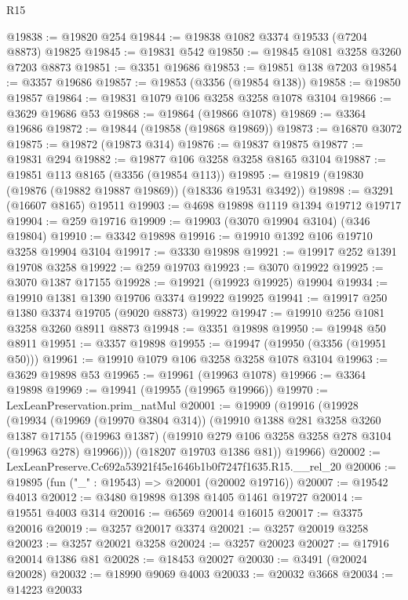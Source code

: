 \begin{lexlean}{R15}
\begin{coremodule}
@19838 := @19820 @254
@19844 := @19838 @1082 @3374 @19533 (@7204 @8873) @19825
@19845 := @19831 @542
@19850 := @19845 @1081 @3258 @3260 @7203 @8873
@19851 := @3351 @19686
@19853 := @19851 @138 @7203
@19854 := @3357 @19686
@19857 := @19853 (@3356 (@19854 @138))
@19858 := @19850 @19857
@19864 := @19831 @1079 @106 @3258 @3258 @1078 @3104
@19866 := @3629 @19686 @53
@19868 := @19864 (@19866 @1078)
@19869 := @3364 @19686
@19872 := @19844 (@19858 (@19868 @19869))
@19873 := @16870 @3072
@19875 := @19872 (@19873 @314)
@19876 := @19837 @19875
@19877 := @19831 @294
@19882 := @19877 @106 @3258 @3258 @8165 @3104
@19887 := @19851 @113 @8165 (@3356 (@19854 @113))
@19895 := @19819 (@19830 (@19876 (@19882 @19887 @19869)) (@18336 @19531 @3492))
@19898 := @3291 (@16607 @8165) @19511
@19903 := @4698 @19898 @1119 @1394 @19712 @19717
@19904 := @259 @19716
@19909 := @19903 (@3070 @19904 @3104) (@346 @19804)
@19910 := @3342 @19898
@19916 := @19910 @1392 @106 @19710 @3258 @19904 @3104
@19917 := @3330 @19898
@19921 := @19917 @252 @1391 @19708 @3258
@19922 := @259 @19703
@19923 := @3070 @19922
@19925 := @3070 @1387 @17155
@19928 := @19921 (@19923 @19925) @19904
@19934 := @19910 @1381 @1390 @19706 @3374 @19922 @19925
@19941 := @19917 @250 @1380 @3374 @19705 (@9020 @8873) @19922
@19947 := @19910 @256 @1081 @3258 @3260 @8911 @8873
@19948 := @3351 @19898
@19950 := @19948 @50 @8911
@19951 := @3357 @19898
@19955 := @19947 (@19950 (@3356 (@19951 @50)))
@19961 := @19910 @1079 @106 @3258 @3258 @1078 @3104
@19963 := @3629 @19898 @53
@19965 := @19961 (@19963 @1078)
@19966 := @3364 @19898
@19969 := @19941 (@19955 (@19965 @19966))
@19970 := LexLeanPreservation.prim_natMul
@20001 := @19909
    (@19916
      (@19928
        (@19934
          (@19969 (@19970 @3804 @314))
          (@19910
            @1388
            @281
            @3258
            @3260
            @1387
            @17155
            (@19963 @1387)
            (@19910 @279 @106 @3258 @3258 @278 @3104 (@19963 @278) @19966)))
        (@18207 @19703 @1386 @81))
      @19966)
@20002 := LexLeanPreserve.Cc692a53921f45e1646b1b0f7247f1635.R15.__rel_20
@20006 := @19895 (fun ("_" : @19543) => @20001 (@20002 @19716))
@20007 := @19542 @4013
@20012 := @3480 @19898 @1398 @1405 @1461 @19727
@20014 := @19551 @4003 @314
@20016 := @6569 @20014 @16015
@20017 := @3375 @20016
@20019 := @3257 @20017 @3374
@20021 := @3257 @20019 @3258
@20023 := @3257 @20021 @3258
@20024 := @3257 @20023
@20027 := @17916 @20014 @1386 @81
@20028 := @18453 @20027
@20030 := @3491 (@20024 @20028)
@20032 := @18990 @9069 @4003
@20033 := @20032 @3668
@20034 := @14223 @20033

\end{coremodule}
\end{lexlean}
